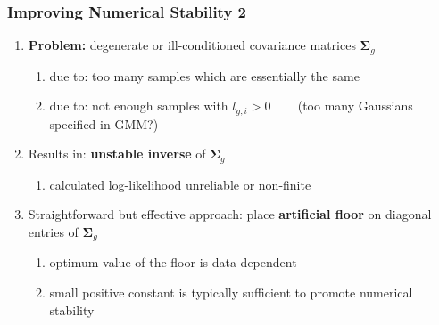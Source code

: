 \documentclass[usenames,dvipsnames]{beamer}
\def\Mat#1{{\boldsymbol{#1}}}
\begin{document}
\begin{frame}
\frametitle{Improving Numerical Stability 2}

\begin{enumerate}[{~~$\boldsymbol{\bullet}$}]

\item {\bf Problem:} degenerate or ill-conditioned covariance matrices $\Mat{\Sigma}_g$

\begin{enumerate}[{$\boldsymbol{\rightarrow}$}]
\renewcommand{\itemsep}{1ex}
\item due to: too many samples which are essentially the same
\item due to: not enough samples with $l_{g,i} > 0$ ~~~ (too many Gaussians specified in GMM?)
\end{enumerate}
\vspace{1ex}


\item Results in: {\bf unstable inverse} of $\Mat{\Sigma}_g$

\begin{enumerate}[{$\boldsymbol{\rightarrow}$}]
\renewcommand{\itemsep}{1ex}
\item calculated log-likelihood unreliable or non-finite
\end{enumerate}
\vspace{1ex}


\item Straightforward but effective approach: place {\bf artificial floor} on diagonal entries of $\Mat{\Sigma}_g$

\begin{enumerate}[{$\boldsymbol{\rightarrow}$}]
\renewcommand{\itemsep}{1ex}
\item optimum value of the floor is data dependent
\item small positive constant is typically sufficient to promote numerical stability
\end{enumerate}


\end{enumerate}
\end{frame}
%
%
%
\end{document}
